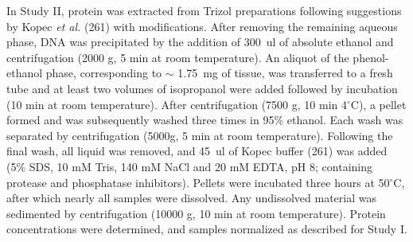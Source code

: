 \documentclass[twoside,10pt]{gihclass} %
\begin{document}
In Study II, protein was extracted from Trizol preparations following suggestions by Kopec \emph{et al.} (261)
with modifications. After removing the remaining aqueous phase, DNA was precipitated by the addition of \SI{300}{ul} of absolute ethanol and centrifugation (2000 g, 5 min at room temperature). An aliquot of the phenol-ethanol phase, corresponding to \(\sim\) \SI{1.75}{mg} of tissue, was transferred to a fresh tube and at least two volumes of isopropanol were added followed by incubation (10 min at room temperature). After centrifugation (7500 g, 10 min 4\(^{\circ}\)C), a pellet formed and was subsequently washed three times in 95\% ethanol. Each wash was separated by centrifugation (5000g, 5 min at room temperature). Following the final wash, all liquid was removed, and \SI{45}{ul} of Kopec buffer (261) was added (5\% SDS, 10 mM Tris, 140 mM NaCl and 20 mM EDTA, pH 8; containing protease and phosphatase inhibitors).
Pellets were incubated three hours at 50\(^{\circ}\)C, after which nearly all samples were dissolved.
Any undissolved material was sedimented by centrifugation (10000 g, 10 min at room temperature).
Protein concentrations were determined, and samples normalized as described for Study I.
\end{document}

